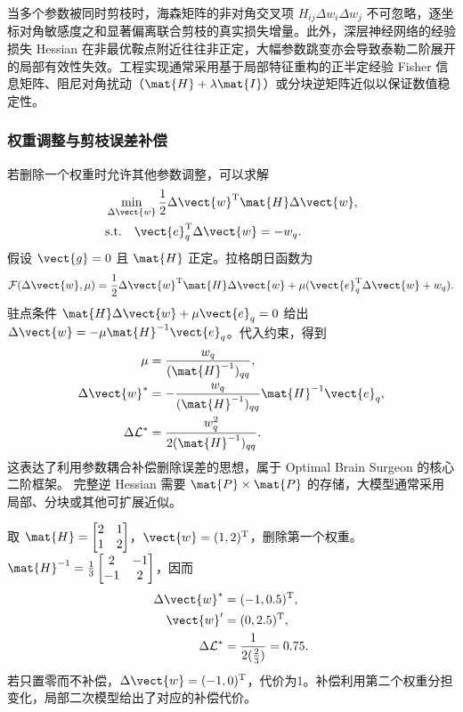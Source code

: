 \documentclass[../textbook.tex]{subfiles}
\begin{document}
当多个参数被同时剪枝时，海森矩阵的非对角交叉项 $H_{ij}\Delta w_i\Delta w_j$ 不可忽略，逐坐标对角敏感度之和显著偏离联合剪枝的真实损失增量。此外，深层神经网络的经验损失 Hessian 在非最优鞍点附近往往非正定，大幅参数跳变亦会导致泰勒二阶展开的局部有效性失效。工程实现通常采用基于局部特征重构的正半定经验 Fisher 信息矩阵、阻尼对角扰动（$\mat{H}+\lambda\mat{I}$）或分块逆矩阵近似以保证数值稳定性。

\subsubsection{权重调整与剪枝误差补偿}
若删除一个权重时允许其他参数调整，可以求解
\begin{equation}
\begin{aligned}
 &\min_{\Delta\vect{w}}\frac12\Delta \vect{w}^{\mathrm{T}} \mat{H}\Delta \vect{w}, \\
 &\text{s.t.}\quad \vect{e}_q^{\mathrm{T}}\Delta \vect{w}=-w_q.
\end{aligned}
\end{equation}
假设 $\vect{g}=0$ 且 $\mat{H}$ 正定。拉格朗日函数为
\begin{equation}
 \mathcal F(\Delta \vect{w},\mu)=\frac12\Delta \vect{w}^{\mathrm{T}} \mat{H}\Delta \vect{w}
 +\mu(\vect{e}_q^{\mathrm{T}}\Delta \vect{w}+w_q).
\end{equation}
驻点条件 $\mat{H}\Delta \vect{w}+\mu \vect{e}_q=0$ 给出 $\Delta \vect{w}=-\mu \mat{H}^{-1}\vect{e}_q$。代入约束，得到
\begin{equation}\label{eq:compress-obs}
\begin{aligned}
 \mu &= \frac{w_q}{(\mat{H}^{-1})_{qq}}, \\
 \Delta \vect{w}^* &= -\frac{w_q}{(\mat{H}^{-1})_{qq}}\mat{H}^{-1}\vect{e}_q, \\
 \Delta\mathcal L^* &= \frac{w_q^2}{2(\mat{H}^{-1})_{qq}}.
\end{aligned}
\end{equation}
这表达了利用参数耦合补偿删除误差的思想，属于 Optimal Brain Surgeon 的核心二阶框架。\cite{hassibi1992obs} 完整逆 Hessian 需要 $\mat{P}\times \mat{P}$ 的存储，大模型通常采用局部、分块或其他可扩展近似。

取 $\mat{H}=\begin{bmatrix}2&1\\1&2\end{bmatrix}$，$\vect{w}=(1,2)^{\mathrm{T}}$，删除第一个权重。$\mat{H}^{-1}=\frac13\begin{bmatrix}2&-1\\-1&2\end{bmatrix}$，因而
\begin{equation}
\begin{aligned}
 \Delta \vect{w}^* &= (-1,0.5)^{\mathrm{T}}, \\
 \vect{w}' &= (0,2.5)^{\mathrm{T}}, \\
 \Delta\mathcal L^* &= \frac{1}{2(\frac{2}{3})}=0.75.
\end{aligned}
\end{equation}
若只置零而不补偿，$\Delta \vect{w}=(-1,0)^{\mathrm{T}}$，代价为1。补偿利用第二个权重分担变化，局部二次模型给出了对应的补偿代价。
\end{document}
